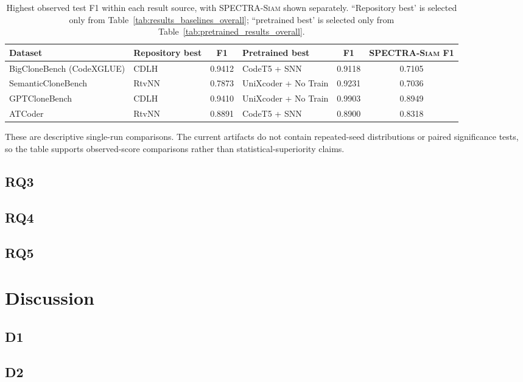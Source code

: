 \documentclass[authoryear,final,5p,times,twocolumn]{elsarticle}
\newcommand{\method}{\textsc{SPECTRA-Siam}}
\theoremstyle{plain}
\begin{document}
\begin{table}[t]
\centering
\caption{Highest observed test F1 within each result source, with \method{} shown separately. ``Repository best' is selected only from Table~\ref{tab:results_baselines_overall}; ``pretrained best' is selected only from Table~\ref{tab:pretrained_results_overall}.}
\label{tab:best_results_by_source}
\small
\begin{tabularx}{\textwidth}{lXcXcc}
\toprule
Dataset & Repository best & F1 & Pretrained best & F1 & \method{} F1 \\
\midrule
BigCloneBench (CodeXGLUE) & CDLH & 0.9412 & CodeT5 + SNN & 0.9118 & 0.7105 \\
SemanticCloneBench & RtvNN & 0.7873 & UniXcoder + No Train & 0.9231 & 0.7036 \\
GPTCloneBench & CDLH & 0.9410 & UniXcoder + No Train & 0.9903 & 0.8949 \\
ATCoder & RtvNN & 0.8891 & CodeT5 + SNN & 0.8900 & 0.8318 \\
\bottomrule
\end{tabularx}
\end{table}

These are descriptive single-run comparisons. The current artifacts do not
contain repeated-seed distributions or paired significance tests, so the table
supports observed-score comparisons rather than statistical-superiority claims.


\subsection{RQ3}
\label{sec:rq3}
\subsection{RQ4}
\label{sec:r4}
\subsection{RQ5}
\label{sec:rq5}

\section{Discussion}
\label{sec:discussion}

\subsection{D1}
\label{sec:sim_measures_baselines}

\subsection{D2}
\label{sec:d2}
\end{document}
